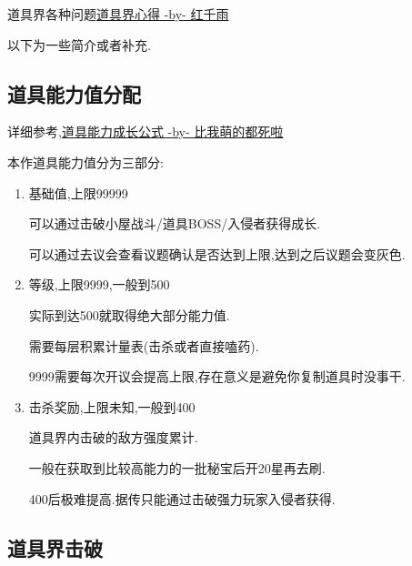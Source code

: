 	道具界各种问题\href{http://tieba.baidu.com/p/3730196003}{道具界心得 -by- 红千雨}

	以下为一些简介或者补充.

	\subsection{道具能力值分配}
	
	详细参考,\href{http://tieba.baidu.com/f?kz=3834692385}{道具能力成长公式 -by- 比我萌的都死啦}

	本作道具能力值分为三部分:

	\begin{enumerate}

		\item 
		基础值,上限99999

		可以通过击破小屋战斗/道具BOSS/入侵者获得成长.

		可以通过去议会查看议题确认是否达到上限,达到之后议题会变灰色.

		\item
		等级,上限9999,一般到500

		实际到达500就取得绝大部分能力值.

		需要每层积累计量表(击杀或者直接嗑药).

		9999需要每次开议会提高上限,存在意义是避免你复制道具时没事干.

		\item
		击杀奖励,上限未知,一般到400

		道具界内击破的敌方强度累计.

		一般在获取到比较高能力的一批秘宝后开20星再去刷.

		400后极难提高.据传只能通过击破强力玩家入侵者获得.

	\end{enumerate}
	
	\newpage

	\subsection{道具界击破}

